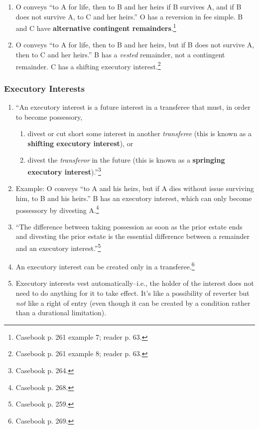\begin{enumerate}
    \begin{enumerate}
        \item O conveys ``to A for life, then to B and her heirs if B survives 
        A, and if B does not survive A, to C and her heirs.'' O has a 
        reversion in fee simple. B and C have \textbf{alternative contingent 
        remainders}.\footnote{Casebook p. 261 example 7; reader p. 63.}
        \item O conveys ``to A for life, then to B and her heirs, but if B 
        does not survive A, then to C and her heirs.'' B has a \emph{vested} 
        remainder, not a contingent remainder. C has a shifting executory 
        interest.\footnote{Casebook p. 261 example 8; reader p. 63.}
    \end{enumerate}
\end{enumerate}

\subsubsection{Executory Interests}

\begin{enumerate}
    \item ``An executory interest is a future interest in a transferee that 
    must, in order to become possessory,
    \begin{enumerate}
        \item divest or cut short some interest in another \emph{transferee} 
        (this is known as a \textbf{shifting executory interest}), or
        \item divest the \emph{transferor} in the future (this is known as a 
        \textbf{springing executory interest}).''\footnote{Casebook p. 264.}
    \end{enumerate}
    \item Example: O conveys ``to A and his heirs, but if A dies without issue 
    surviving him, to B and his heirs.'' B has an executory interest, which 
    can only become possessory by divesting A.\footnote{Casebook p. 268.}
    \item ``The difference between taking possession as soon as the prior 
    estate ends and divesting the prior estate is the essential difference 
    between a remainder and an executory interest.''\footnote{Casebook p. 259.}
    \item An executory interest can be created only in a 
    transferee.\footnote{Casebook p. 269.}
    \item Executory interests vest automatically--i.e., the holder of the 
    interest does not need to do anything for it to take effect. It's like a 
    possibility of reverter but \emph{not} like a right of entry (even though 
    it can be created by a condition rather than a durational limitation).
\end{enumerate}

